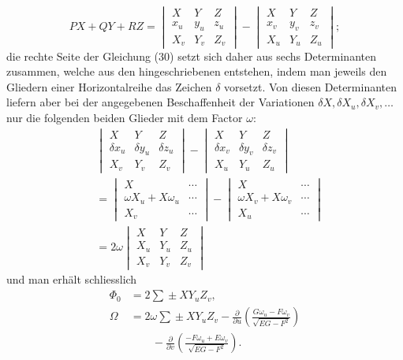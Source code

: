 \documentclass[11pt,a4paper,leqno]{article}
\begin{document}
\[
PX+QY+RZ=
\begin{vmatrix}X&Y&Z\\x_u&y_u&z_u\\X_v&Y_v&Z_v\end{vmatrix}
-\begin{vmatrix}X&Y&Z\\x_v&y_v&z_v\\X_u&Y_u&Z_u\end{vmatrix};
\]
die rechte Seite der Gleichung (30) setzt sich daher aus sechs
Determinanten zusammen, welche aus den hingeschriebenen entstehen, indem
man jeweils den Gliedern einer Horizontalreihe das Zeichen $\delta$
vorsetzt. Von diesen Determinanten liefern aber bei der angegebenen
Beschaffenheit der Variationen $\delta X,\delta X_u,\delta X_v,\ldots$ nur
die folgenden beiden Glieder mit dem Factor $\omega$:
\[
\begin{aligned}
&\begin{vmatrix}X&Y&Z\\
\delta x_u&\delta y_u&\delta z_u\\X_v&Y_v&Z_v\end{vmatrix}
-\begin{vmatrix}X&Y&Z\\
\delta x_v&\delta y_v&\delta z_v\\X_u&Y_u&Z_u\end{vmatrix}\\
&=\begin{vmatrix}X&\cdots\\
\omega X_u+X\omega_u&\cdots\\X_v&\cdots\end{vmatrix}
-\begin{vmatrix}X&\cdots\\
\omega X_v+X\omega_v&\cdots\\X_u&\cdots\end{vmatrix}\\
&=2\omega\begin{vmatrix}X&Y&Z\\X_u&Y_u&Z_u\\X_v&Y_v&Z_v\end{vmatrix}
\end{aligned}
\]
und man erhält schliesslich
\[
\begin{aligned}
\Phi_0&=2\sum\!\pm XY_uZ_v,\\
\Omega&=2\omega\sum\!\pm XY_uZ_v
-\frac{\partial}{\partial u}\left(
\frac{G\omega_u-F\omega_v}{\sqrt{EG-F^2}}\right)\\
&\qquad-\frac{\partial}{\partial v}\left(
\frac{-F\omega_u+E\omega_v}{\sqrt{EG-F^2}}\right).
\end{aligned}
\]
\end{document}
